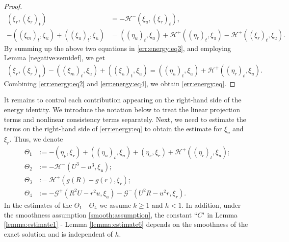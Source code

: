\documentclass[11pt]{article}
\newcommand{\Hcal} {\mathcal{H}}
\newcommand{\Gcal} {\mathcal{G}}
\numberwithin{equation}{section}
\begin{document}
\begin{proof}
\begin{equation}\label{err:energy:eq3}
\begin{split}
 (\xi_r, (\xi_r)_t)&=-\Hcal^-(\xi_u, (\xi_r)_t),\\
 -((\xi_m)_t,\xi_u)+((\xi_u)_t, \xi_u)&=((\eta_u)_t, \xi_u)+\Hcal^+((\eta_r)_t, \xi_u)-\Hcal^+((\xi_r)_t, \xi_u).
\end{split}
\end{equation}
By summing up the above two equations in \eqref{err:energy:eq3}, and employing Lemma \ref{negative:semidef},  we get
\begin{equation}
	\begin{split}
\label{err:energy:eq4}
 (\xi_r, (\xi_r)_t)-((\xi_m)_t,\xi_u)+((\xi_u)_t, \xi_u)=((\eta_u)_t, \xi_u)+\Hcal^+((\eta_r)_t, \xi_u).
\end{split}
\end{equation}
Combining \eqref{err:energy:eq2} and \eqref{err:energy:eq4}, we obtain \eqref{err:energy:eq}.
\end{proof}
It remains to control each contribution appearing on the right-hand side of the energy
identity. We introduce the notation below to treat the linear projection terms and nonlinear
consistency terms separately. Next, we need to estimate the terms on the right-hand side of \eqref{err:energy:eq} to obtain the estimate for $\xi_u$ and $\xi_r$. Thus, we denote
\begin{align*}
\Theta_1&:=-(\eta_p, \xi_r)+((\eta_u)_t,\xi_u)+(\eta_s,\xi_r)+\Hcal^+((\eta_r)_t,\xi_u);\\
\Theta_2&:=-\Hcal^-(U^3-u^3, \xi_u);\\
\Theta_3&:=\Hcal^+(g(R)-g(r),\xi_r);\\
\Theta_4&:=-\Gcal^+(R^2U\!-\!r^2u, \xi_u)-\Gcal^-(U^2R-u^2r, \xi_r).
\end{align*}
In the estimates of the $\Theta_1$ - $\Theta_4$ we assume $k\geq 1$ and $h<1$. In addition, under the smoothness assumption \eqref{smooth:assumption}, the constant ``$C$" in Lemma \ref{lemma:estimate1} - Lemma \ref{lemma:estimate6} depends on the smoothness of the exact solution and is independent of $h$.
\end{document}
